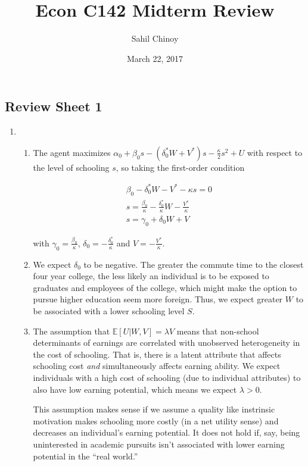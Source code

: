 \documentclass{article}
\title{Econ C142 Midterm Review}
\author{Sahil Chinoy}
\date{March 22, 2017}
\begin{document}
\maketitle{}

\subsection*{Review Sheet 1}

\begin{enumerate}

	\item 

	\begin{enumerate}

		\item The agent maximizes $\alpha_0 + \beta_0 s - (\delta_0^*W + V^*)s - \frac{\kappa}{2}s^2 + U$ with respect to the level of schooling $s$, so taking the first-order condition

		\begin{align*}
		\beta_0 - \delta_0^*W - V^* - \kappa s = 0 \\
		s = \frac{\beta_0}{\kappa} - \frac{\delta_0^*}{\kappa}W - \frac{V^*}{\kappa} \\
		s = \gamma_0 + \delta_0 W + V
		\end{align*}

		with $\gamma_0 = \frac{\beta_0}{\kappa}$, $\delta_0 = -\frac{\delta_0^*}{\kappa}$ and $V = - \frac{V^*}{\kappa}$.

		\item We expect $\delta_0$ to be negative. The greater the commute time to the closest four year college, the less likely an individual is to be exposed to graduates and employees of the college, which might make the option to pursue higher education seem more foreign. Thus, we expect greater $W$ to be associated with a lower schooling level $S$.

		\item The assumption that $\mathbb{E}[U|W,V] = \lambda V$ means that non-school determinants of earnings are correlated with unobserved heterogeneity in the cost of schooling. That is, there is a latent attribute that affects schooling cost \textit{and} simultaneously affects earning ability. We expect individuals with a high cost of schooling (due to individual attributes) to also have low earning potential, which means we expect $\lambda > 0$.

		This assumption makes sense if we assume a quality like instrinsic motivation makes schooling more costly (in a net utility sense) and decreases an individual's earning potential. It does not hold if, say, being uninterested in academic pursuits isn't associated with lower earning potential in the ``real world.''


\end{enumerate}
\end{enumerate}
\end{document}
